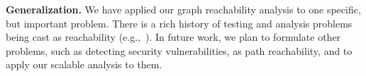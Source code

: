 \textbf{Generalization.}
We have applied our graph reachability analysis to one specific, but
important problem.  There is a rich history of testing and analysis
problems being cast as reachability (e.g.,~\cite{RepsHS95}).  In future
work, we plan to formulate other problems, such as detecting security
vulnerabilities, as path reachability, and to apply our scalable analysis
to them.






